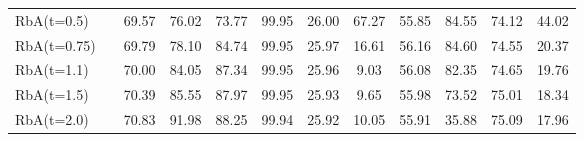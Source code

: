 \begin{table}[!tp]
{\begin{tabular}{l|c|cc|cc|cc|cc|cc}
RbA(t=0.5)     &       & 69.57 & 76.02 & 73.77 & 99.95 & 26.00 & 67.27 & 55.85 & 84.55 & 74.12 & 44.02 \\
RbA(t=0.75)    &       & 69.79 & 78.10 & 84.74 & 99.95 & 25.97 & 16.61 & 56.16 & 84.60 & 74.55 & 20.37 \\
RbA(t=1.1)     &       & 70.00 & 84.05 & 87.34 & 99.95 & 25.96 & 9.03  & 56.08 & 82.35 & 74.65 & 19.76 \\
RbA(t=1.5)     &       & 70.39 & 85.55 & 87.97 & 99.95 & 25.93 & 9.65  & 55.98 & 73.52 & 75.01 & 18.34 \\
RbA(t=2.0)     &       & 70.83 & 91.98 & 88.25 & 99.94 & 25.92 & 10.05 & 55.91 & 35.88 & 75.09 & 17.96 \\
\bottomrule
\end{tabular}}
\end{table}